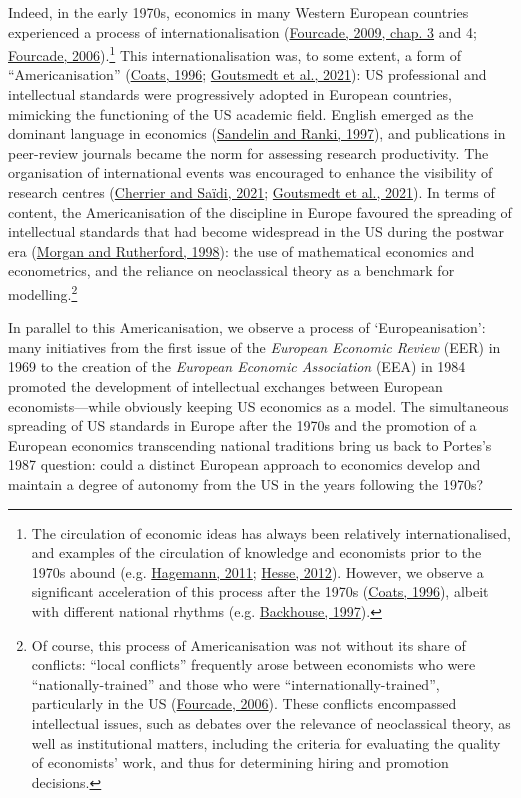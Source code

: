 \documentclass[
  12pt,
  onecolumn]{article}
\begin{document}
Indeed, in the early 1970s, economics in many Western European countries
experienced a process of internationalisation
(\protect\hyperlink{ref-fourcade2009}{Fourcade, 2009, chap. 3} and 4;
\protect\hyperlink{ref-fourcade2006}{Fourcade, 2006}).\footnote{The
  circulation of economic ideas has always been relatively
  internationalised, and examples of the circulation of knowledge and
  economists prior to the 1970s abound (e.g.
  \protect\hyperlink{ref-hagemann2011a}{Hagemann, 2011};
  \protect\hyperlink{ref-hesse2012}{Hesse, 2012}). However, we observe a
  significant acceleration of this process after the 1970s
  (\protect\hyperlink{ref-coats1996}{Coats, 1996}), albeit with
  different national rhythms (e.g.
  \protect\hyperlink{ref-backhouse1997a}{Backhouse, 1997}).} This
internationalisation was, to some extent, a form of ``Americanisation''
(\protect\hyperlink{ref-coats1996}{Coats, 1996};
\protect\hyperlink{ref-goutsmedt2021}{Goutsmedt et al., 2021}): US
professional and intellectual standards were progressively adopted in
European countries, mimicking the functioning of the US academic field.
English emerged as the dominant language in economics
(\protect\hyperlink{ref-sandelin1997}{Sandelin and Ranki, 1997}), and
publications in peer-review journals became the norm for assessing
research productivity. The organisation of international events was
encouraged to enhance the visibility of research centres
(\protect\hyperlink{ref-cherrier2021}{Cherrier and Saïdi, 2021};
\protect\hyperlink{ref-goutsmedt2021}{Goutsmedt et al., 2021}). In terms
of content, the Americanisation of the discipline in Europe favoured the
spreading of intellectual standards that had become widespread in the US
during the postwar era (\protect\hyperlink{ref-morgan1998}{Morgan and
Rutherford, 1998}): the use of mathematical economics and econometrics,
and the reliance on neoclassical theory as a benchmark for
modelling.\footnote{Of course, this process of Americanisation was not
  without its share of conflicts: ``local conflicts'' frequently arose
  between economists who were ``nationally-trained'' and those who were
  ``internationally-trained'', particularly in the US
  (\protect\hyperlink{ref-fourcade2006}{Fourcade, 2006}). These
  conflicts encompassed intellectual issues, such as debates over the
  relevance of neoclassical theory, as well as institutional matters,
  including the criteria for evaluating the quality of economists' work,
  and thus for determining hiring and promotion decisions.}

In parallel to this Americanisation, we observe a process of
`Europeanisation': many initiatives from the first issue of the
\emph{European Economic Review} (EER) in 1969 to the creation of the
\emph{European Economic Association} (EEA) in 1984 promoted the
development of intellectual exchanges between European
economists---while obviously keeping US economics as a model. The
simultaneous spreading of US standards in Europe after the 1970s and the
promotion of a European economics transcending national traditions bring
us back to Portes's 1987 question: could a distinct European approach to
economics develop and maintain a degree of autonomy from the US in the
years following the 1970s?
\end{document}
